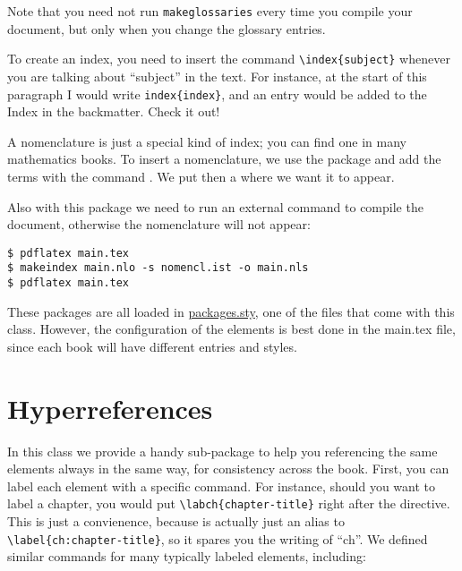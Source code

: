 Note that you need not run \texttt{makeglossaries} every time you 
compile your document, but only when you change the glossary entries.

To create an index, you need to insert the command 
\lstinline|\index{subject}| whenever you are talking about 
\enquote{subject} in the text. For instance, at the start of this 
paragraph I would write \lstinline|index{index}|, and an entry would be 
added to the Index in the backmatter. Check it out!


A nomenclature is just a special kind of index; you can find one in many
mathematics books. To insert a nomenclature, we use the package
 and add the terms with the command . We
put then a  where we want it to appear.

Also with this package we need to run an external command to compile the 
document, otherwise the nomenclature will not appear:

\begin{lstlisting}[style=kaolstplain]
$ pdflatex main.tex
$ makeindex main.nlo -s nomencl.ist -o main.nls
$ pdflatex main.tex
\end{lstlisting}

These packages are all loaded in 
\href{style/packages.sty}{packages.sty}, one of the files that come with 
this class. However, the configuration of the elements is best done in 
the main.tex file, since each book will have different entries and 
styles.


\section{Hyperreferences}

In this class we provide a handy sub-package to help you referencing the 
same elements always in the same way, for consistency across the book. 
First, you can label each element with a specific command. For instance, 
should you want to label a chapter, you would put 
\lstinline|\labch{chapter-title}| right after the  
directive. This is just a convienence, because  is 
actually just an alias to \lstinline|\label{ch:chapter-title}|, so it 
spares you the writing of \enquote{ch}. We defined similar commands for 
many typically labeled elements, including:

